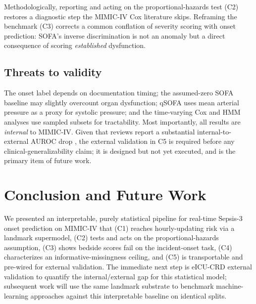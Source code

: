 \documentclass[conference]{IEEEtran}
\begin{document}
Methodologically, reporting and acting on the proportional-hazards test (C2)
restores a diagnostic step the MIMIC-IV Cox literature skips. Reframing the
benchmark (C3) corrects a common conflation of severity scoring with onset
prediction: SOFA's inverse discrimination is not an anomaly but a direct
consequence of scoring \emph{established} dysfunction.

\subsection{Threats to validity}
The onset label depends on documentation timing; the assumed-zero SOFA baseline
may slightly overcount organ dysfunction; qSOFA uses mean arterial pressure as a
proxy for systolic pressure; and the time-varying Cox and HMM analyses use
sampled subsets for tractability. Most importantly, all results are
\emph{internal} to MIMIC-IV. Given that reviews report a substantial
internal-to-external AUROC drop \cite{wang2025srpm}, the external validation in
C5 is required before any clinical-generalizability claim; it is designed but
not yet executed, and is the primary item of future work.

\section{Conclusion and Future Work}
\label{sec:conclusion}
We presented an interpretable, purely statistical pipeline for real-time
Sepsis-3 onset prediction on MIMIC-IV that (C1) reaches hourly-updating risk via
a landmark supermodel, (C2) tests and acts on the proportional-hazards
assumption, (C3) shows bedside scores fail on the incident-onset task, (C4)
characterizes an informative-missingness ceiling, and (C5) is transportable and
pre-wired for external validation. The immediate next step is eICU-CRD external
validation \cite{pollard2018eicu} to quantify the internal/external gap for this
statistical model; subsequent work will use the same landmark substrate to
benchmark machine-learning approaches against this interpretable baseline on
identical splits.

\printbibliography
\end{document}

